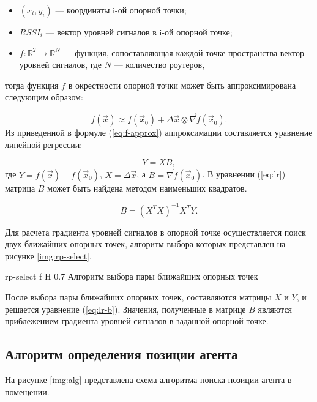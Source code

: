 \begin{itemize}[label=---]
    \item $(x_i, y_i)$ --- координаты i-ой опорной точки;
    \item $RSSI_i$ --- вектор уровней сигналов в i-ой опорной точке;
    \item $f: \mathbb{R}^2 \rightarrow \mathbb{R}^N$ --- функция, сопоставляющая каждой точке пространства вектор уровней сигналов, где $N$ --- количество роутеров,
\end{itemize}
тогда функция $f$ в окрестности опорной точки может быть аппроксимирована следующим образом:

\begin{equation}
    f(\vec{x}) \approx f(\vec{x}_0) + \Delta \vec{x} \otimes \vec{\nabla} f(\vec{x}_0).
    \label{eq:f-approx}
\end{equation}
Из приведенной в формуле (\ref{eq:f-approx}) аппроксимации составляется уравнение линейной регрессии:

\begin{equation}
    Y = XB,
    \label{eq:lr}
\end{equation}
где $Y = f(\vec{x}) - f (\vec{x}_0)$, $X = \Delta \vec{x}$, а $B = \vec{\nabla} f(\vec{x}_0)$. В уравнении (\ref{eq:lr}) матрица $B$ может быть найдена методом наименьших квадратов.

\begin{equation}
    B = (X^TX)^{-1}X^TY.
    \label{eq:lr-b}
\end{equation}

Для расчета градиента уровней сигналов в опорной точке осуществляется поиск двух ближайших опорных точек, алгоритм выбора которых представлен на рисунке \ref{img:rp-select}.

    {rp-select}
    {f}
    {H}
    {0.7\linewidth}
    {Алгоритм выбора пары ближайших опорных точек}

После выбора пары ближайших опорных точек, составляются матрицы $X$ и $Y$, и решается уравнение (\ref{eq:lr-b}). Значения, полученные в матрице $B$ являются приблежением градиента уровней сигналов в заданной опорной точке.

\subsection{Алгоритм определения позиции агента}

На рисунке \ref{img:alg} представлена схема алгоритма поиска позиции агента в помещении.

